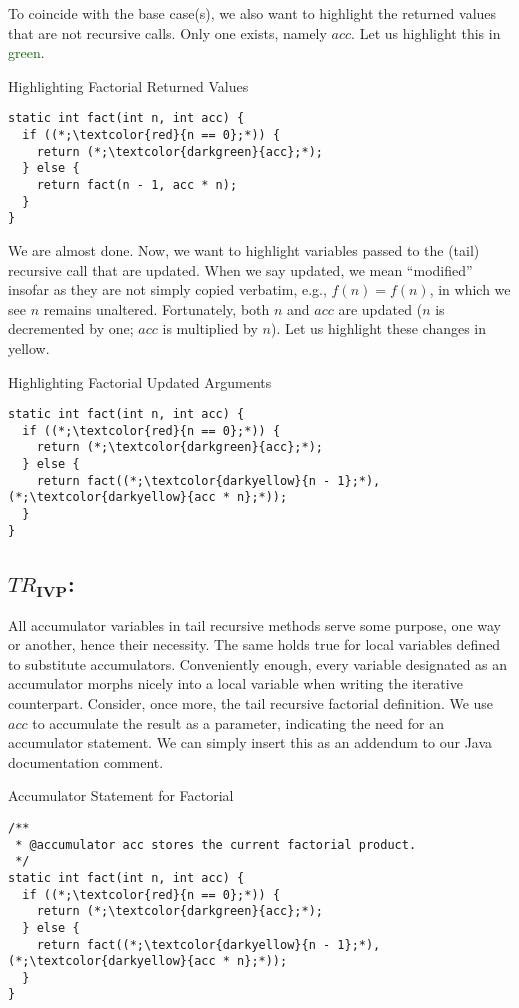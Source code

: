 To coincide with the base case(s), we also want to highlight the returned values that are not recursive calls. Only one exists, namely $\textit{acc}$. Let us highlight this in \textcolor{darkgreen}{green}.

\begin{cl}[]{Highlighting Factorial Returned Values}
\begin{lstlisting}[language=MyJava]
static int fact(int n, int acc) {
  if ((*;\textcolor{red}{n == 0};*)) {
    return (*;\textcolor{darkgreen}{acc};*);
  } else {
    return fact(n - 1, acc * n);
  }
}
\end{lstlisting}
\end{cl}

We are almost done. Now, we want to highlight variables passed to the (tail) recursive call that are updated. When we say updated, we mean ``modified'' insofar as they are not simply copied verbatim, e.g., $f(n) = f(n)$, in which we see $n$ remains unaltered. Fortunately, both $n$ and $\textit{acc}$ are updated ($n$ is decremented by one; $\textit{acc}$ is multiplied by $n$). Let us highlight these changes in \textcolor{darkyellow}{yellow}. 

\begin{cl}[]{Highlighting Factorial Updated Arguments}
\begin{lstlisting}[language=MyJava]
static int fact(int n, int acc) {
  if ((*;\textcolor{red}{n == 0};*)) {
    return (*;\textcolor{darkgreen}{acc};*);
  } else {
    return fact((*;\textcolor{darkyellow}{n - 1};*), (*;\textcolor{darkyellow}{acc * n};*));
  }
}
\end{lstlisting}
\end{cl}

\subsection*{\textit{$TR_\mathbf{IVP}$}:} All accumulator variables in tail recursive methods serve some purpose, one way or another, hence their necessity. The same holds true for local variables defined to substitute accumulators. Conveniently enough, every variable designated as an accumulator morphs nicely into a local variable when writing the iterative counterpart. Consider, once more, the tail recursive factorial definition. We use $\textit{acc}$ to accumulate the result as a parameter, indicating the need for an accumulator statement. We can simply insert this as an addendum to our Java documentation comment.

\begin{cl}[]{Accumulator Statement for Factorial}
\begin{lstlisting}[language=MyJava]
/**
 * @accumulator acc stores the current factorial product. 
 */
static int fact(int n, int acc) {
  if ((*;\textcolor{red}{n == 0};*)) {
    return (*;\textcolor{darkgreen}{acc};*);
  } else {
    return fact((*;\textcolor{darkyellow}{n - 1};*), (*;\textcolor{darkyellow}{acc * n};*));
  }
}
\end{lstlisting}
\end{cl}

